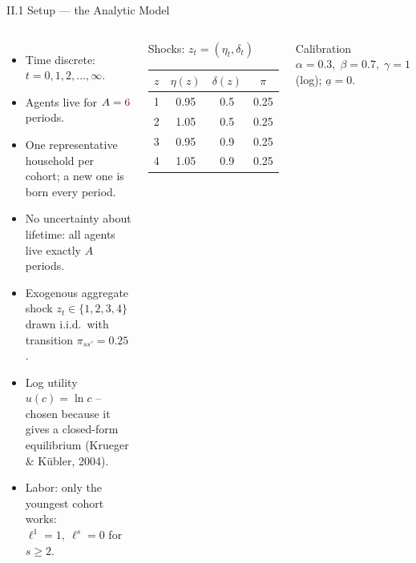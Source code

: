 \documentclass[aspectratio=169,11pt]{beamer}
\newcommand{\emphc}[1]{\textcolor{harvardcrimson}{#1}}
\begin{document}
\begin{frame}{II.1 Setup --- the Analytic Model}
\footnotesize
\begin{columns}[T]
\begin{itemize}\itemsep1pt
    \item Time discrete: $t = 0, 1, 2, \ldots, \infty$.
    \item Agents live for $A = \emphc{6}$ periods.
    \item \emphc{One representative household per cohort}; a new one is born every period.
    \item \emphc{No uncertainty about lifetime}: all agents live exactly $A$ periods.
    \item Exogenous aggregate shock $z_t \in \{1,2,3,4\}$ drawn \emphc{i.i.d.}\ with transition $\pi_{ss'} = 0.25$.
    \item \emphc{Log utility} $u(c) = \ln c$ -- chosen because it gives a \emphc{closed-form} equilibrium (Krueger \& K\"ubler, 2004).
    \item \emphc{Labor:} only the youngest cohort works: $\ell^1 = 1,\ \ell^s = 0$ for $s \ge 2$.
\end{itemize}

\begin{block}{Shocks: $z_t = (\eta_t, \delta_t)$}
{\scriptsize\renewcommand{\arraystretch}{0.95}
\begin{tabular}{cccc}
\toprule
$z$ & $\eta(z)$ & $\delta(z)$ & $\pi$\\
\midrule
1 & 0.95 & 0.5 & 0.25\\
2 & 1.05 & 0.5 & 0.25\\
3 & 0.95 & 0.9 & 0.25\\
4 & 1.05 & 0.9 & 0.25\\
\bottomrule
\end{tabular}}
\end{block}

\begin{block}{Calibration}
{\scriptsize $\alpha = 0.3,\;\beta = 0.7,\;\gamma = 1$ (log); $\underline{a}=0$.}
\end{block}
\end{columns}
\end{frame}
\end{document}
